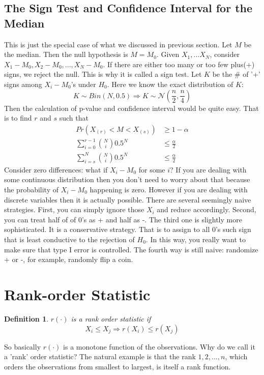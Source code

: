 \documentclass[twoside]{article}
\newtheorem*{definition*}{Definition}
\begin{document}
\subsection{The Sign Test and Confidence Interval for the Median}
This is just the special case of what we discussed in previous section. Let $M$ be the median. Then the null hypothesis is $M = M_0$. Given $X_1, ... X_N$, consider $X_1 - M_0, X_2 - M_0, ..., X_N - M_0$. If there are either too many or too few plus(+) signs, we reject the null. This is why it is called a sign test. Let $K$ be the \# of '+' signs among $X_i - M_0$'s under $H_0$. Here we know the exact distribution of $K$: 
$$
K \sim Bin \left( N, 0.5 \right) \Rightarrow K \sim \mathcal{N}( \frac{n}{2}, \frac{n}{4})
$$
Then the calculation of p-value and confidence interval would be quite easy. That is to find $r$ and $s$ such that
\begin{align*}
	Pr \left( X_{(r)} < M < X_{(s)} \right) &\geqslant 1 - \alpha \\
	\sum_{i=0}^{r-1} \binom{N}{i} 0.5^N &\leqslant \frac{\alpha}{2} \\
	\sum_{i=s}^{N} \binom{N}{i} 0.5^N &\leqslant \frac{\alpha}{2}
\end{align*}
Consider zero differences: what if $X_i - M_0$ for some $i$? If you are dealing with some continuous distribution then you don't need to worry about that because the probability of $X_i - M_0$ happening is zero. However if you are dealing with discrete variables then it is actually possible. There are several seemingly naive strategies. First, you can simply ignore those $X_i$ and reduce accordingly. Second, you can treat half of of 0's as + and half as -. The third one is slightly more sophisticated. It is a conservative strategy. That is to assign to all 0's such sign that is least conductive to the rejection of $H_0$. In this way, you really want to make sure that type I error is controlled. The fourth way is still naive: randomize + or -, for example, randomly flip a coin. 

\section{Rank-order Statistic}
\begin{definition*}
	$r(\cdot)$ is a rank order statistic if
	$$
	X_i \leqslant X_j \Rightarrow r(X_i) \leqslant r(X_j)
	$$
\end{definition*}
So basically $r(\cdot)$ is a monotone function of the observations. Why do we call it a 'rank' order statistic? The natural example is that the rank $1,2,...,n$, which orders the observations from smallest to largest, is itself a rank function. 
\end{document}
